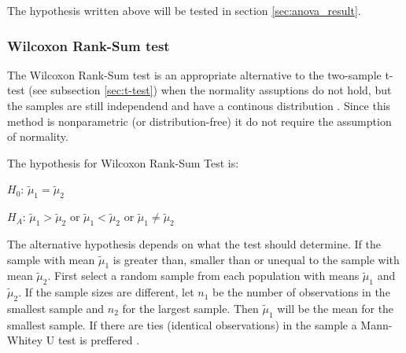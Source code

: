 The hypothesis written above will be tested in section \ref{sec:anova_result}. %


\subsubsection[Wilcoxon]{Wilcoxon Rank-Sum test}\label{sec:Wilcoxon}
The Wilcoxon Rank-Sum test is an appropriate alternative to the two-sample t-test (see subsection \ref{sec:t-test}) when the normality assuptions do not hold, but the samples are still independend and have a continous distribution \citep{Walpole2012}. Since this method is nonparametric (or distribution-free) it do not require the assumption of normality. 

The hypothesis for Wilcoxon Rank-Sum Test is:\newline

\centerline{$H_{0}$:  $\tilde{\mu}_{1} =  \tilde{\mu}_{2} $} 
\centerline{$H_{A}$: $\tilde{\mu}_{1} >  \tilde{\mu}_{2} $ or $\tilde{\mu}_{1} <  \tilde{\mu}_{2} $ or $\tilde{\mu}_{1} \neq  \tilde{\mu}_{2} $}

The alternative hypothesis depends on what the test should determine. If the sample with mean $\tilde{\mu}_1$ is greater than, smaller than or unequal to the sample with mean $\tilde{\mu}_2$.  First select a random sample from each population with means $\tilde{\mu}_{1} $ and $ \tilde{\mu}_{2} $. If the sample sizes are different, let $n_{1}$ be the number of observations in the smallest sample and $n_{2}$ for the largest sample. Then $\tilde{\mu}_1$ will be the mean for the smallest sample. If there are ties (identical observations) in the sample a Mann-Whitey U test is preffered \citep{TheScipycommunity2017}. 

